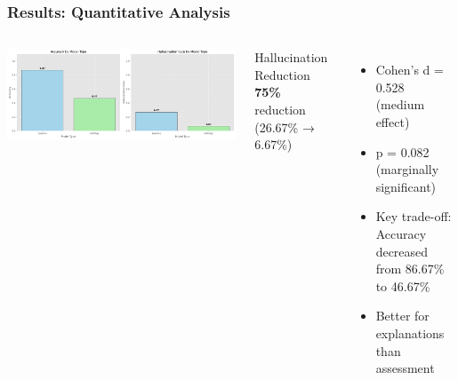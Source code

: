\documentclass{beamer}
\begin{document}
\begin{frame}
\frametitle{Results: Quantitative Analysis}

\begin{columns}

\begin{center}
\includegraphics[width=\textwidth]{../results_final/model_comparison.png}
\end{center}

\begin{alertblock}{Hallucination Reduction}  
\textbf{75\%} reduction (26.67\% → 6.67\%)
\end{alertblock}

\begin{itemize}
    \item Cohen's d = 0.528 (medium effect)
    \item p = 0.082 (marginally significant)
    \item \alert{Key trade-off}: Accuracy decreased from 86.67\% to 46.67\%
    \item Better for explanations than assessment
\end{itemize}

\end{columns}
\end{frame}
\end{document}

